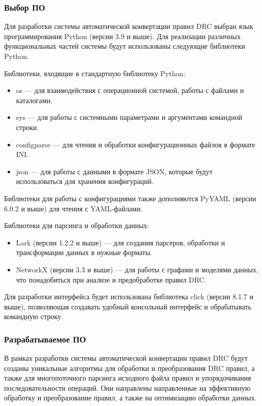 \subsubsection{Выбор ПО}

Для разработки системы автоматической конвертации правил DRC
выбран язык программирования Python (версии 3.9 и выше).
Для реализации различных функциональных частей системы
будут использованы следующие библиотеки Python.

Библиотеки, входящие в стандартную библиотеку Python:

\begin{itemize}
	\item os --- для взаимодействия с операционной системой,
		работы с файлами и каталогами.
	\item sys --- для работы с системными параметрами
		и аргументами командной строки.
	\item configparse --- для чтения
		и обработки конфигурационных файлов в формате INI.
	\item json --- для работы с данными в формате JSON,
		которые будут использоваться для хранения конфигураций.
\end{itemize}
  
Библиотеки для работы с конфигурациями также дополняются
PyYAML (версии 6.0.2 и выше) для чтения с YAML-файлами.

Библиотеки для парсинга и обработки данных:

\begin{itemize}
	\item Lark (версии 1.2.2 и выше) --- для создания парсеров,
		обработки и трансформации данных в нужные форматы.
	\item NetworkX (версии 3.3 и выше) --- для работы с графами
		и моделями данных,
		что понадобиться при анализе и предобработке правил DRC.
\end{itemize}

Для разработки интерфейса будет использована библиотека
click (версии 8.1.7 и выше), позволяющая создавать удобный
консольный интерфейс и обрабатывать командную строку.

\subsubsection{Разрабатываемое ПО}

В рамках разработки системы автоматической конвертации правил DRC
будут созданы уникальные алгоритмы для обработки и преобразования DRC правил,
а также для многопоточного парсинга исходного файла правил
и упорядочивания последовательности операций.
Они направлены направленные на эффективную обработку
и преобразование правил, а также на оптимизацию обработки данных.

